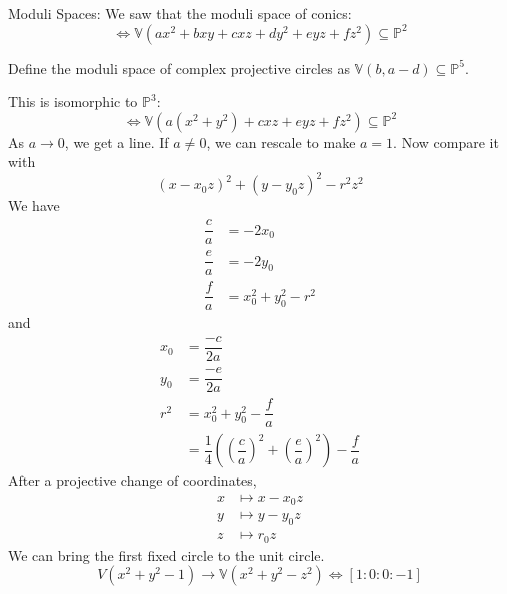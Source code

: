 \documentclass{report}
\begin{document}
Moduli Spaces: We saw that the moduli space of conics:
    \begin{equation*}
        [a : b :c : d : e : f] \iff \mathbb{V}(ax^{2} + bxy + cxz + dy^{2} + eyz + fz^{2}) \subseteq \mathbb{ P}^{2}
    \end{equation*}
\begin{definition}{}
    Define the moduli space of complex projective circles as $\mathbb{V}(b, a - d) \subseteq \mathbb{ P}^{5}$.
\end{definition}
This is isomorphic to $\mathbb{P}^{3}$:
    \begin{equation*}
        [a : c : e : f] \iff \mathbb{ V}(a(x^{2} + y^{2}) + cxz + eyz + fz^{2}) \subseteq \mathbb{ P}^{2}
    \end{equation*}
As $a \rightarrow 0$, we get a line. If $a \neq 0$, we can rescale to make $a = 1$. Now compare it with
    \begin{equation*}
        (x - x_{0}z)^{2} + (y - y_{0}z)^{2} - r^{2}z^{2} 
    \end{equation*}
We have
    \begin{align*}
        \dfrac{c}{a} &= -2x_{0}                       \\
        \dfrac{e}{a} &= -2y_{0}                       \\
        \dfrac{f}{a} &= x_{0}^{2} + y_{0}^{2} - r^{2}   
    \end{align*}
and
    \begin{align*}
        x_{0} &= \dfrac{-c}{2a}                                                                                        \\
        y_{0} &= \dfrac{-e}{2a}                                                                                        \\
        r^{2} &= x_{0}^{2} + y_{0}^{2} - \dfrac{f}{a}                                                                  \\
              &= \dfrac{1}{4}\left(\left(\dfrac{c}{a}\right)^{2} + \left(\dfrac{e}{a}\right)^{2}\right) - \dfrac{f}{a}   
    \end{align*}
After a projective change of coordinates, 
    \begin{align*}
        x & \mapsto  x - x_{0}z \\
        y &\mapsto   y - y_{0}z \\
        z &\mapsto   r_{0}z       
    \end{align*}
We can bring the first fixed circle to the unit circle. 
    \begin{equation*}
        V(x^{2} + y^{2} - 1) \rightarrow \mathbb{ V}(x^{2} + y^{2} - z^{2}) \iff [ 1 : 0 : 0 : -1]
    \end{equation*}
\end{document}
